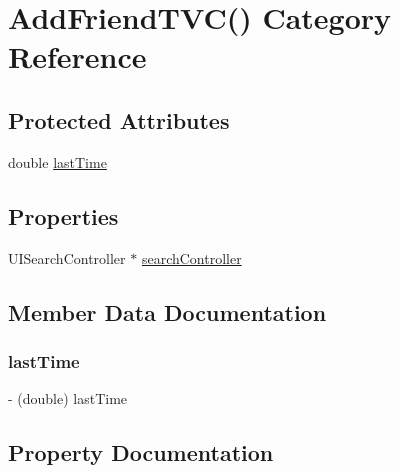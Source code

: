 \hypertarget{category_add_friend_t_v_c_07_08}{}\section{Add\+Friend\+T\+VC() Category Reference}
\label{category_add_friend_t_v_c_07_08}
\subsection*{Protected Attributes}
\begin{DoxyCompactItemize}
\item 
double \hyperlink{category_add_friend_t_v_c_07_08_a6323ba99e14eac0be9b474d11f7f241e}{last\+Time}
\end{DoxyCompactItemize}
\subsection*{Properties}
\begin{DoxyCompactItemize}
\item 
U\+I\+Search\+Controller $\ast$ \hyperlink{category_add_friend_t_v_c_07_08_aa6c4bce0fd584e4df484a73903a258c1}{search\+Controller}
\end{DoxyCompactItemize}


\subsection{Member Data Documentation}
\hypertarget{category_add_friend_t_v_c_07_08_a6323ba99e14eac0be9b474d11f7f241e}{}\label{category_add_friend_t_v_c_07_08_a6323ba99e14eac0be9b474d11f7f241e} 
\subsubsection{\texorpdfstring{last\+Time}{lastTime}}
{\footnotesize\ttfamily -\/ (double) last\+Time\hspace{0.3cm}{\ttfamily [protected]}}



\subsection{Property Documentation}
\hypertarget{category_add_friend_t_v_c_07_08_aa6c4bce0fd584e4df484a73903a258c1}{}\label{category_add_friend_t_v_c_07_08_aa6c4bce0fd584e4df484a73903a258c1} 
